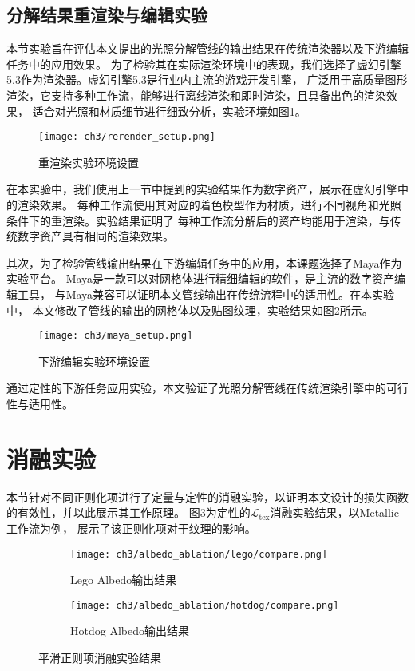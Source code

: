\subsection{分解结果重渲染与编辑实验}

本节实验旨在评估本文提出的光照分解管线的输出结果在传统渲染器以及下游编辑任务中的应用效果。
为了检验其在实际渲染环境中的表现，我们选择了虚幻引擎5.3作为渲染器。虚幻引擎5.3是行业内主流的游戏开发引擎，
广泛用于高质量图形渲染，它支持多种工作流，能够进行离线渲染和即时渲染，且具备出色的渲染效果，
适合对光照和材质细节进行细致分析，实验环境如图\ref{fig:rerender_setup}。

\begin{figure}[htb]
  \centering
  \texttt{[image: ch3/rerender\_setup.png]}
  \caption{重渲染实验环境设置}
  \label{fig:rerender_setup}
\end{figure}

在本实验中，我们使用上一节中提到的实验结果作为数字资产，展示在虚幻引擎中的渲染效果。
每种工作流使用其对应的着色模型作为材质，进行不同视角和光照条件下的重渲染。实验结果证明了
每种工作流分解后的资产均能用于渲染，与传统数字资产具有相同的渲染效果。

其次，为了检验管线输出结果在下游编辑任务中的应用，本课题选择了Maya作为实验平台。
Maya是一款可以对网格体进行精细编辑的软件，是主流的数字资产编辑工具，
与Maya兼容可以证明本文管线输出在传统流程中的适用性。在本实验中，
本文修改了管线的输出的网格体以及贴图纹理，实验结果如图\ref{fig:edit_setup}所示。

\begin{figure}[htb]
  \centering
  \texttt{[image: ch3/maya\_setup.png]}
  \caption{下游编辑实验环境设置}
  \label{fig:edit_setup}
\end{figure}

\newpage

通过定性的下游任务应用实验，本文验证了光照分解管线在传统渲染引擎中的可行性与适用性。

\section{消融实验}

本节针对不同正则化项进行了定量与定性的消融实验，以证明本文设计的损失函数的有效性，并以此展示其工作原理。
图\ref{fig:l_tex_ablation}为定性的$\mathcal{L}_\text{tex}$消融实验结果，以Metallic工作流为例，
展示了该正则化项对于纹理的影响。
\begin{figure}[H]
  \centering
  \begin{subfigure}[c]{0.45\textwidth}
    \centering
    \texttt{[image: ch3/albedo\_ablation/lego/compare.png]}
    \caption{Lego Albedo输出结果}
  \end{subfigure}
  \hspace{2mm}
  \begin{subfigure}[c]{0.45\textwidth}
    \centering
    \texttt{[image: ch3/albedo\_ablation/hotdog/compare.png]}
    \caption{Hotdog Albedo输出结果}
  \end{subfigure}
  \caption{平滑正则项消融实验结果}
  \label{fig:l_tex_ablation}
\end{figure}

